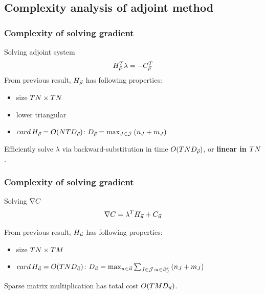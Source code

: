 \subsection[complexity]{Complexity analysis of adjoint method} %
\label{sec:complexity_analysis_of_adjoint_method}

\begin{frame}[t]\frametitle{Complexity of solving gradient}
    




\begin{block}{Solving adjoint system}
\begin{equation}
    H_{\vec{\rho}}^T \lambda = -C_{\vec{\rho}}^T
\end{equation}
From previous result, $H_{\vec{\rho}}$ has following properties:

\begin{itemize}
    \item size $TN \times TN$
    \item lower triangular
    \item $card\,H_{\vec{\rho}} = O(NTD_{\vec{\rho}})$: $D_{\vec{\rho}}=\max_{J\in\mathcal{J}}\left(n_{J}+m_{J}\right)$
\end{itemize}

Efficiently solve $\lambda$ via backward-substitution in time $O(T N D_{\vec{\rho}})$, or \textbf{linear in $T N$}.
\end{block}
\end{frame}

\begin{frame}[t]\frametitle{Complexity of solving gradient}

\begin{block}{Solving $\nabla C$}
\begin{equation}
    \nabla C = \lambda^T H_{\vec{u}} + C_{\vec{u}}
\end{equation}

From previous result, $H_{\vec{u}}$ has following properties:

\begin{itemize}
    \item size $TN \times  T M$
    \item $card\,H_{\vec{u}} = O(T N D_{\vec{u}})$: $D_{\vec{u}}=\max_{u_{}^{}\in\vec{u}}\sum_{J\in\mathcal{J}:u_{}^{}\in\vec{u}_{J}^{k}}\left(n_{J}+m_{J}\right)$
\end{itemize}

Sparse matrix multiplication has total cost $O(T M D_{\vec{u}})$.
\end{block}

\end{frame}

